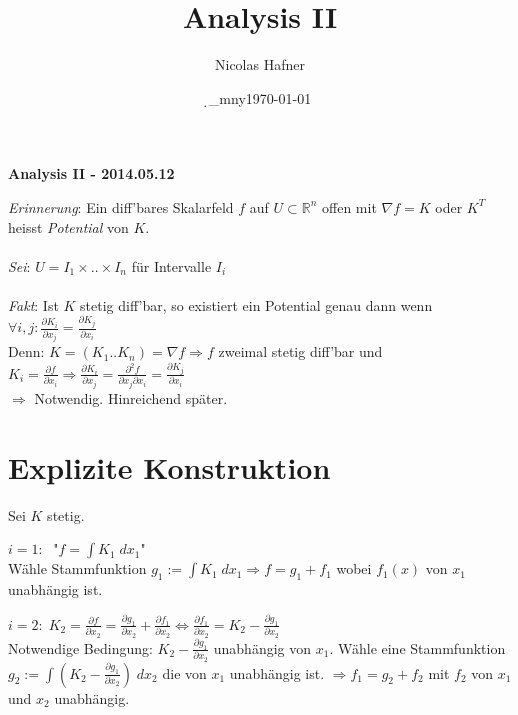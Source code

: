 \documentclass[12pt,a4paper,titlepage]{article}
\author{Nicolas Hafner}
\title{Analysis II}
\date{\d_mny\today}
\renewcommand{\d}{\partial}
\newcommand{\setR}{\mathbb{R}}
\begin{document}
	
\begin{center}{\bfseries\Huge Analysis II - 2014.05.12}\end{center}
\textit{Erinnerung}: Ein diff'bares Skalarfeld $f$ auf $U\subset\setR^n$ offen mit $\nabla f=K$ oder $K^T$ heisst \emph{Potential} von $K$. \\
\\
\textit{Sei}: $U=I_1\times..\times I_n$ für Intervalle $I_i$ \\
\\
\textit{Fakt}: Ist $K$ stetig diff'bar, so existiert ein Potential genau dann wenn $\forall i,j:\frac{\d K_i}{\d x_j}=\frac{\d K_j}{\d x_i}$ \\
Denn: $K=(K_1..K_n)=\nabla f \Rightarrow f$ zweimal stetig diff'bar und $K_i=\frac{\d f}{\d x_i} \Rightarrow \frac{\d K_i}{\d x_j}=\frac{\d^2f}{\d x_j\d x_i}=\frac{\d K_j}{\d x_i}$ \\
$\Rightarrow$ Notwendig. Hinreichend später.

\section*{Explizite Konstruktion}
Sei $K$ stetig.

$i=1:\;$ "$f=\int K_1 \;dx_1$" \\
Wähle Stammfunktion $g_1:=\int K_1\;dx_1 \Rightarrow f=g_1+f_1$ wobei $f_1(x)$ von $x_1$ unabhängig ist.

$i=2:\; K_2=\frac{\d f}{\d x_2}=\frac{\d g_1}{\d x_2}+\frac{\d f_1}{\d x_2} \iff \frac{\d f_1}{\d x_2}=K_2-\frac{\d g_1}{\d x_2}$ \\
Notwendige Bedingung: $K_2-\frac{\d g_1}{\d x_2}$ unabhängig von $x_1$. Wähle eine Stammfunktion \\
$g_2:=\int(K_2-\frac{\d g_1}{\d x_2}) \;dx_2$ die von $x_1$ unabhängig ist. $\Rightarrow f_1=g_2+f_2$ mit $f_2$ von $x_1$ und $x_2$ unabhängig.
\end{document}
